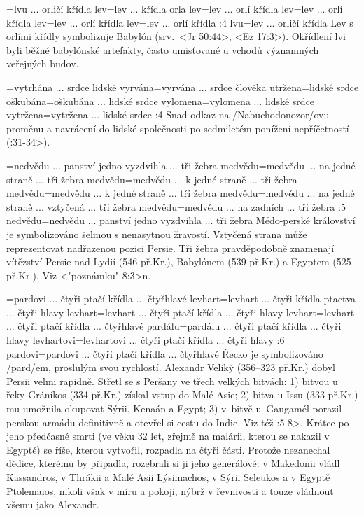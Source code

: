 ={lvu ... orličí křídla}  %
   {lev}={lev ... křídla orla}   %
   {lev}={lev ... orlí křídla}   %
   {lev}={lev ... orlí křídla}   %
   {lev}={lev ... orlí křídla}   %
   {lev}={lev ... orlí křídla}   %
:4 {lvu}={lev ... orličí křídla} 
     Lev s orlími křídly symbolizuje Babylón (srv.~<Jr 50:44>, <Ez 17:3>).
     Okřídlení lvi byli běžné babylónské artefakty, často umisťované u vchodů významných veřejných budov.      
     
={vytrhána ... srdce lidské}   %
   {vyrvána}={vyrvána ... srdce člověka}   %
   {utržena}={lidské srdce}   %
   {oškubána}={oškubána ... lidské srdce}   %
   {vylomena}={vylomena ... lidské srdce}   %
   {vytržena}={vytržena ... lidské srdce}   %
:4 {} Snad odkaz na \x/Nabuchodonozor/ovu
     proměnu a navrácení do lidské společnosti po sedmiletém ponížení nepříčetností
     (:31-34>).

={nedvědu ... panství jedno vyzdvihla ... tři žebra}    %
   {medvědu}={medvědu ... na jedné straně ... tři žebra}   %
   {medvědu}={medvědu ... k jedné straně ... tři žebra}   %
   {medvědu}={medvědu ... k jedné straně ... tři žebra}   %
   {medvědu}={medvědu ... na jedné straně ... vztyčená ... tři žebra}   %
   {medvědu}={medvědu ... na zadních ...  tři žebra}   %
:5 {nedvědu}={nedvědu ... panství jedno vyzdvihla ... tři žebra} 
     Médo-perské království je symbolizováno šelmou s nenasytnou žravostí. Vztyčená
     strana může reprezentovat nadřazenou pozici Persie. Tři žebra pravděpodobně znamenají
     vítězství Persie nad Lydií (546 př.Kr.), Babylónem (539 př.Kr.) a Egyptem (525 př.Kr.).
     Viz <"poznámku" 8:3>n.

={pardovi ... čtyři ptačí křídla ... čtyřhlavé}  %
   {levhart}={levhart ... čtyři křídla ptactva ...  čtyři hlavy}   %
   {levhart}={levhart ... čtyři ptačí křídla ... čtyři hlavy}    %
   {levhart}={levhart ... čtyři ptačí křídla ... čtyřhlavé}    %
   {pardálu}={pardálu ... čtyři ptačí křídla ... čtyři hlavy}    %
   {levhartovi}={levhartovi ... čtyři ptačí křídla ... čtyři hlavy}    %
:6 {pardovi}={pardovi ... čtyři ptačí křídla ... čtyřhlavé}
     Řecko je symbolizováno \x/pard/em, proslulým svou rychlostí.
     Alexandr Veliký (356--323 př.Kr.) dobyl Persii velmi rapidně.
     Střetl se s Peršany ve třech velkých bitvách:
     1) bitvou u řeky Gráníkos (334 př.Kr.) získal vstup do Malé Asie; 
     2) bitva u Issu (333 př.Kr.) mu umožnila okupovat Sýrii, Kenaán a Egypt; 
     3) v~bitvě u~Gaugamél porazil perskou armádu definitivně a otevřel si cestu do Indie.
        Viz též :5-8>. Krátce po jeho předčasné smrti (ve věku 32 let, zřejmě na malárii, kterou se nakazil v Egyptě) se říše, kterou
        vytvořil, rozpadla na čtyři části.  Protože nezanechal dědice, kterému by připadla, rozebrali si ji jeho generálové: v Makedonii vládl Kassandros, v Thrákii a Malé Asii Lýsimachos, v Sýrii Seleukos a v Egyptě Ptolemaios, nikoli však v míru a pokoji, nýbrž v řevnivosti a touze vládnout všemu jako Alexandr.

